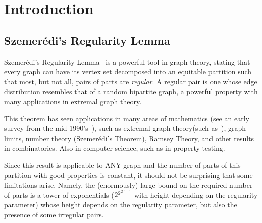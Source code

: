 \section{Introduction} \label{sec:introduction}

    \subsection{Szemer\'edi's Regularity Lemma}

    Szemer\'edi's Regularity Lemma~\cite{regular_partitions_of_graphs} is a powerful tool in graph theory,
    stating that every graph can have its vertex set decomposed into an equitable partition such that most,
    but not all, pairs of parts are \emph{regular}.
    A regular pair is one whose edge distribution resembles that of a random bipartite graph, a powerful property with
    many applications in extremal graph theory.

    This theorem has seen applications in many areas of mathematics
    (see an early survey from the mid 1990's~\cite{survey of regularity lemma}), such as extremal graph
    theory(such as~\cite{kuhn ostus, ...}), graph limits, number theory (Szemer\'edi's Theorem), Ramsey Theory,
    and other results in combinatorics.
    Also in computer science, such as in property testing.

    Since this result is applicable to ANY graph and the number of parts of this partition with good properties is constant,
    it should not be surprising that some limitations arise.
    Namely, the (enormously) large bound on the required number of parts is a tower of
        exponentials ($2^{2^{2^{\text{\reflectbox{$\dots$}}}}}$ with height depending on the regularity parameter)
    whose height depends on the regularity parameter, but also the presence of some irregular pairs.

